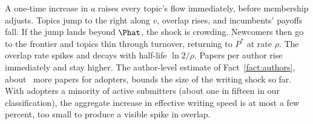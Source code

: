 A one-time increase in $a$ raises every topic's flow immediately, before
membership adjusts. Topics jump to the right along $v$, overlap rises, and
incumbents' payoffs fall. If the jump lands beyond $\Phat$, the shock is crowding.
Newcomers then go to the frontier and topics thin through turnover, returning
to $P^*$ at rate $\rho$. The overlap rate spikes and decays with half-life
$\ln2/\rho$. Papers per author rise immediately and stay higher. The
author-level estimate of Fact~\ref{fact:authors}, about \empLLMallPct\ more
papers for adopters, bounds the size of the writing shock so far. With adopters a minority of
active submitters (about one in fifteen in our classification), the aggregate
increase in effective writing speed is at most a few percent, too small to
produce a visible spike in overlap.
